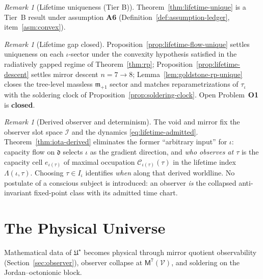 \documentclass[aps,prd,onecolumn,amsmath,amssymb,nofootinbib,11pt]{revtex4-2}
\numberwithin{equation}{section}
\theoremstyle{plain}
\theoremstyle{definition}
\theoremstyle{remark}
\newtheorem{remark}[theorem]{Remark}
\newcommand{\Void}{\mathcal{V}}
\newcommand{\Mirror}{\mathsf{M}}
\newcommand{\capacity}{\mathcal{C}}
\begin{document}
\begin{remark}[Lifetime uniqueness (Tier B)]
\label{rem:lifetime-tier}
Theorem~\ref{thm:lifetime-unique} is a Tier~B result under assumption
\textbf{A6} (Definition~\ref{def:assumption-ledger}, item~\ref{asm:convex}).
\end{remark}

\begin{remark}[Lifetime gap closed]
\label{rem:lifetime-full-gap}
Proposition~\ref{prop:lifetime-flow-unique} settles uniqueness on each
$\iota$-sector under the convexity hypothesis satisfied in the radiatively
gapped regime of Theorem~\ref{thm:rp}; Proposition~\ref{prop:lifetime-descent}
settles mirror descent $n=7\to8$; Lemma~\ref{lem:goldstone-rp-unique} closes
the tree-level massless $\mathfrak{m}_{+1}$ sector and matches
reparametrizations of $\tau_\iota$ with the soldering clock of
Proposition~\ref{prop:soldering-clock}. Open Problem~\textbf{O1} is
\textbf{closed}.
\end{remark}

\begin{remark}[Derived observer and determinism]\label{rem:observer-derived}
The void and mirror fix the observer slot space $\mathcal{I}$ and the dynamics
\eqref{eq:lifetime-admitted}. Theorem~\ref{thm:iota-derived} eliminates the
former ``arbitrary input'' for $\iota$: capacity flow on $\mathfrak{d}$
selects $\iota$ as the gradient direction, and \emph{who observes at $\tau$}
is the capacity cell $e_{\iota(\tau)}$ of maximal occupation
$\capacity_{\iota(\tau)}(\tau)$ in the lifetime index
$\Lambda(\iota,\tau)$. Choosing $\tau\in I_\iota$ identifies \emph{when} along
that derived worldline. No postulate of a conscious subject is introduced: an
observer \emph{is} the collapsed anti-invariant fixed-point class with its
admitted time chart.
\end{remark}%
\section{The Physical Universe}
\label{sec:physics}

Mathematical data of $\mathfrak{U}^\star$ becomes physical through mirror
quotient observability (Section~\ref{sec:observer}), observer collapse at
$\Mirror^7(\Void)$, and soldering on the Jordan--octonionic block.
\end{document}

